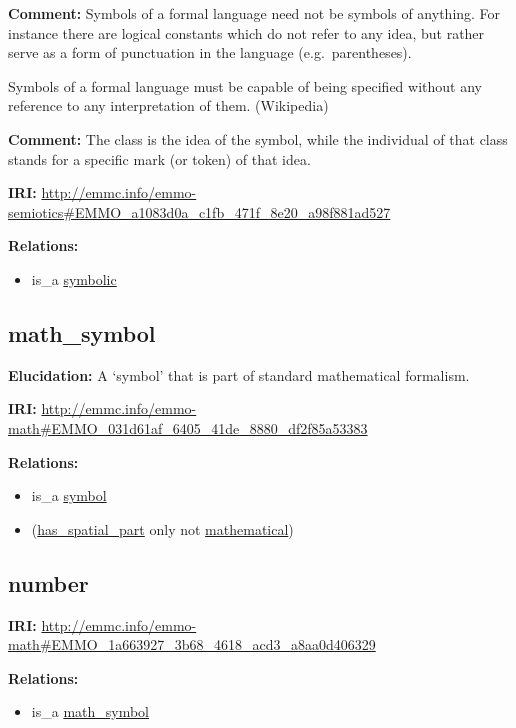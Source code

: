\documentclass[a4paper,]{report}
\providecommand{\tightlist}{%
  \setlength{\itemsep}{0pt}\setlength{\parskip}{0pt}}
\begin{document}
\textbf{Comment:} Symbols of a formal language need not be symbols of
anything. For instance there are logical constants which do not refer to
any idea, but rather serve as a form of punctuation in the language
(e.g.~parentheses).

Symbols of a formal language must be capable of being specified without
any reference to any interpretation of them. (Wikipedia)

\textbf{Comment:} The class is the idea of the symbol, while the
individual of that class stands for a specific mark (or token) of that
idea.

\textbf{IRI:}
\url{http://emmc.info/emmo-semiotics\#EMMO_a1083d0a_c1fb_471f_8e20_a98f881ad527}

\textbf{Relations:}

\begin{itemize}
\tightlist
\item
  is\_a \protect\hyperlink{symbolic}{symbolic}
\end{itemize}

\hypertarget{math_symbol}{%
\subsection{math\_symbol}\label{math_symbol}}

\textbf{Elucidation:} A `symbol' that is part of standard mathematical
formalism.

\textbf{IRI:}
\url{http://emmc.info/emmo-math\#EMMO_031d61af_6405_41de_8880_df2f85a53383}

\textbf{Relations:}

\begin{itemize}
\tightlist
\item
  is\_a \protect\hyperlink{symbol}{symbol}
\item
  (\protect\hyperlink{has_spatial_part}{has\_spatial\_part} only not
  \protect\hyperlink{mathematical}{mathematical})
\end{itemize}

\hypertarget{number}{%
\subsection{number}\label{number}}

\textbf{IRI:}
\url{http://emmc.info/emmo-math\#EMMO_1a663927_3b68_4618_acd3_a8aa0d406329}

\textbf{Relations:}

\begin{itemize}
\tightlist
\item
  is\_a \protect\hyperlink{math_symbol}{math\_symbol}
\end{itemize}
\end{document}
